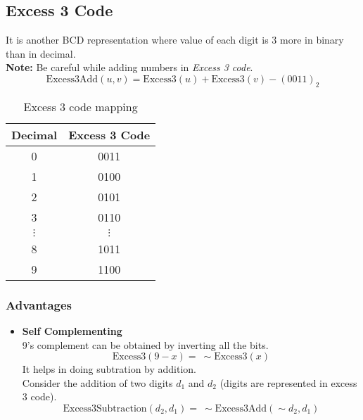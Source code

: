 \documentclass[oneside]{book}
\begin{document}
\subsection{Excess 3 Code}
It is another BCD representation where value of each digit is 3 more in binary than in decimal.
\\\textbf{Note:} Be careful while adding numbers in \textit{Excess 3 code}.
\[
	\mathrm{Excess3Add}(u, v) = \mathrm{Excess3}(u) + \mathrm{Excess3}(v) - (0011)_2
\]
\begin{table}[ht]
	\centering
	\begin{tabular}{|cc|}
		\hline
		Decimal    & Excess 3 Code \\
		\hline
		0          & 0011          \\
		1          & 0100          \\
		2          & 0101          \\
		3          & 0110          \\
		\(\vdots\) & \(\vdots\)    \\
		8          & 1011          \\
		9          & 1100          \\
		\hline
	\end{tabular}
	\caption{Excess 3 code mapping}
\end{table}
\subsubsection{Advantages}
\begin{itemize}
	\item \textbf{Self Complementing}\\
	      9's complement can be obtained by inverting all the bits.
	      \[
		      \mathrm{Excess3}(9 - x) =\ \sim \mathrm{Excess3}(x)
	      \]
	      It helps in doing subtration by addition.\\
	      Consider the addition of two digits $d_1$ and $d_2$ (digits are represented in excess 3 code).
	      \[
		      \mathrm{Excess3Subtraction}(d_2, d_1) =\ \sim\mathrm{Excess3Add}(\sim d_2, d_1)
	      \]
\end{itemize}
\end{document}
